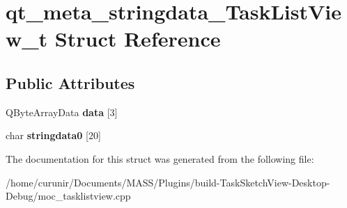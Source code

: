 \hypertarget{structqt__meta__stringdata___task_list_view__t}{}\section{qt\+\_\+meta\+\_\+stringdata\+\_\+\+Task\+List\+View\+\_\+t Struct Reference}
\label{structqt__meta__stringdata___task_list_view__t}
\subsection*{Public Attributes}
\begin{DoxyCompactItemize}
\item 
Q\+Byte\+Array\+Data {\bfseries data} \mbox{[}3\mbox{]}\hypertarget{structqt__meta__stringdata___task_list_view__t_a8ad2c226ac8778a31897d25f523cbf1f}{}\label{structqt__meta__stringdata___task_list_view__t_a8ad2c226ac8778a31897d25f523cbf1f}

\item 
char {\bfseries stringdata0} \mbox{[}20\mbox{]}\hypertarget{structqt__meta__stringdata___task_list_view__t_a42668f9de1866f4cfd191b1689185b10}{}\label{structqt__meta__stringdata___task_list_view__t_a42668f9de1866f4cfd191b1689185b10}

\end{DoxyCompactItemize}


The documentation for this struct was generated from the following file\+:\begin{DoxyCompactItemize}
\item 
/home/curunir/\+Documents/\+M\+A\+S\+S/\+Plugins/build-\/\+Task\+Sketch\+View-\/\+Desktop-\/\+Debug/moc\+\_\+tasklistview.\+cpp\end{DoxyCompactItemize}
